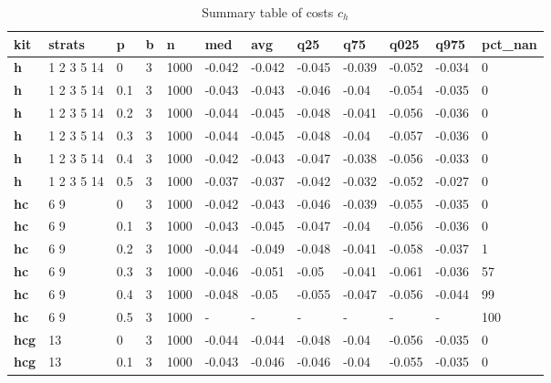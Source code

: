 \begin{longtable}[h]{|p{0.8cm}|p{1.5cm}|p{1cm}|p{1cm}|p{1cm}|p{1cm}|p{1cm}|p{1cm}|p{1cm}|p{1cm}|p{1cm}|p{1.5cm}|}
\caption{Summary table of costs $c_h$}
\label{tab:costs_mod_h} \\
      \hline
\textbf{ kit} & \textbf{ strats} & \textbf{ p} & \textbf{ b} & \textbf{ n} & \textbf{ med} & \textbf{ avg} & \textbf{ q25} & \textbf{ q75} & \textbf{ q025} & \textbf{ q975} & \textbf{ pct\_nan}
    \\ \hline
  \textbf{h   } &  1 2 3 5 14 &   0 & 3 & 1000 & -0.042 & -0.042 & -0.045 & -0.039 & -0.052 & -0.034 &   0
    \\ \hline
  \textbf{h   } &  1 2 3 5 14 & 0.1 & 3 & 1000 & -0.043 & -0.043 & -0.046 &  -0.04 & -0.054 & -0.035 &   0
    \\ \hline
  \textbf{h   } &  1 2 3 5 14 & 0.2 & 3 & 1000 & -0.044 & -0.045 & -0.048 & -0.041 & -0.056 & -0.036 &   0
    \\ \hline
  \textbf{h   } &  1 2 3 5 14 & 0.3 & 3 & 1000 & -0.044 & -0.045 & -0.048 &  -0.04 & -0.057 & -0.036 &   0
    \\ \hline
  \textbf{h   } &  1 2 3 5 14 & 0.4 & 3 & 1000 & -0.042 & -0.043 & -0.047 & -0.038 & -0.056 & -0.033 &   0
    \\ \hline
  \textbf{h   } &  1 2 3 5 14 & 0.5 & 3 & 1000 & -0.037 & -0.037 & -0.042 & -0.032 & -0.052 & -0.027 &   0
    \\ \hline
  \textbf{hc  } &  6 9        &   0 & 3 & 1000 & -0.042 & -0.043 & -0.046 & -0.039 & -0.055 & -0.035 &   0
    \\ \hline
  \textbf{hc  } &  6 9        & 0.1 & 3 & 1000 & -0.043 & -0.045 & -0.047 &  -0.04 & -0.056 & -0.036 &   0
    \\ \hline
  \textbf{hc  } &  6 9        & 0.2 & 3 & 1000 & -0.044 & -0.049 & -0.048 & -0.041 & -0.058 & -0.037 &   1
    \\ \hline
  \textbf{hc  } &  6 9        & 0.3 & 3 & 1000 & -0.046 & -0.051 &  -0.05 & -0.041 & -0.061 & -0.036 &  57
    \\ \hline
  \textbf{hc  } &  6 9        & 0.4 & 3 & 1000 & -0.048 &  -0.05 & -0.055 & -0.047 & -0.056 & -0.044 &  99
    \\ \hline
  \textbf{hc  } &  6 9        & 0.5 & 3 & 1000 & - & - & - & - & - & - & 100
    \\ \hline
  \textbf{hcg } &  13         &   0 & 3 & 1000 & -0.044 & -0.044 & -0.048 &  -0.04 & -0.056 & -0.035 &   0
    \\ \hline
  \textbf{hcg } &  13         & 0.1 & 3 & 1000 & -0.043 & -0.046 & -0.046 &  -0.04 & -0.055 & -0.035 &   0

\end{longtable}
